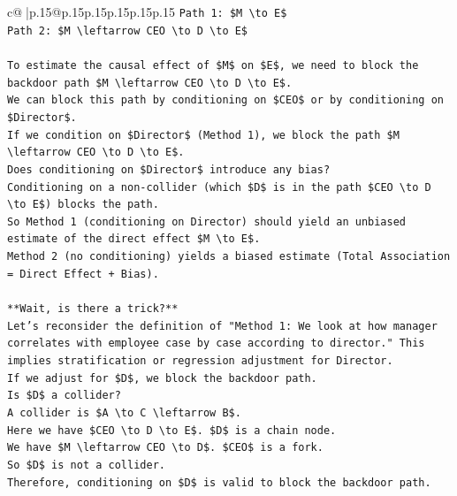 \documentclass{article}
\begin{document}
{\begin{supertabular}{c@{$\;$}|p{.15\linewidth}@{}p{.15\linewidth}p{.15\linewidth}p{.15\linewidth}p{.15\linewidth}p{.15\linewidth}}
{{{\texttt{Path 1: \$M \textbackslash{}to E\$} \\
\texttt{Path 2: \$M \textbackslash{}leftarrow CEO \textbackslash{}to D \textbackslash{}to E\$} \\
\\ 
\texttt{To estimate the causal effect of \$M\$ on \$E\$, we need to block the backdoor path \$M \textbackslash{}leftarrow CEO \textbackslash{}to D \textbackslash{}to E\$.} \\
\texttt{We can block this path by conditioning on \$CEO\$ or by conditioning on \$Director\$.} \\
\texttt{If we condition on \$Director\$ (Method 1), we block the path \$M \textbackslash{}leftarrow CEO \textbackslash{}to D \textbackslash{}to E\$.} \\
\texttt{Does conditioning on \$Director\$ introduce any bias?} \\
\texttt{Conditioning on a non{-}collider (which \$D\$ is in the path \$CEO \textbackslash{}to D \textbackslash{}to E\$) blocks the path.} \\
\texttt{So Method 1 (conditioning on Director) should yield an unbiased estimate of the direct effect \$M \textbackslash{}to E\$.} \\
\texttt{Method 2 (no conditioning) yields a biased estimate (Total Association = Direct Effect + Bias).} \\
\\ 
\texttt{**Wait, is there a trick?**} \\
\texttt{Let's reconsider the definition of "Method 1: We look at how manager correlates with employee case by case according to director." This implies stratification or regression adjustment for Director.} \\
\texttt{If we adjust for \$D\$, we block the backdoor path.} \\
\texttt{Is \$D\$ a collider?} \\
\texttt{A collider is \$A \textbackslash{}to C \textbackslash{}leftarrow B\$.} \\
\texttt{Here we have \$CEO \textbackslash{}to D \textbackslash{}to E\$. \$D\$ is a chain node.} \\
\texttt{We have \$M \textbackslash{}leftarrow CEO \textbackslash{}to D\$. \$CEO\$ is a fork.} \\
\texttt{So \$D\$ is not a collider.} \\
\texttt{Therefore, conditioning on \$D\$ is valid to block the backdoor path.} \\
\\ 
}}}
\end{supertabular}}
\end{document}
